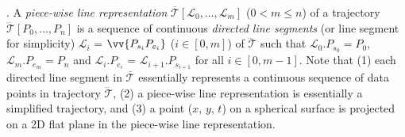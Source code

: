. A \textit{piece-wise line representation} $\overline{\mathcal{T}}\left[\mathcal{L}_0, \ldots, \mathcal{L}_m\right]$ ($0< m \le n$) of a trajectory $\dddot{\mathcal{T}}\left[P_0, \ldots, P_n\right]$ is a sequence of continuous \textit{directed line segments} (or line segment for simplicity) $\mathcal{L}_{i}$ = $\vv{P_{s_i}P_{e_i}}$ ($i\in\left[0,m\right]$) of $\dddot{\mathcal{T}}$ such that $\mathcal{L}_{0}.P_{s_0} = P_0$, $\mathcal{L}_{m}.P_{e_m} = P_n$ and  $\mathcal{L}_{i}.P_{e_i}$ = $\mathcal{L}_{i+1}.P_{s_{i+1}}$ for all $i\in\left[0, m-1\right]$.
Note that (1) each directed line segment in $\overline{\mathcal{T}}$ essentially represents a continuous sequence of data points in trajectory $\dddot{\mathcal{T}}$, (2) a piece-wise line representation is essentially a simplified trajectory, {and (3) a point ($x$, $y$, $t$) on a spherical surface is  projected on a 2D flat plane in the piece-wise line representation.}


